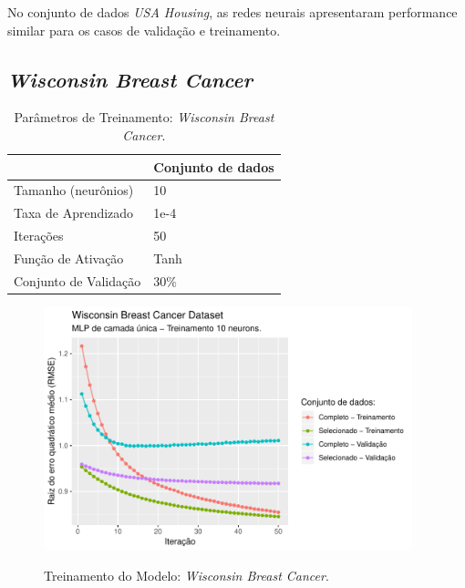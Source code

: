 No conjunto de dados \textit{USA Housing}, as redes neurais apresentaram performance similar para os casos de validação e treinamento.

\FloatBarrier
\subsection{\textit{Wisconsin Breast Cancer}}

\begin{table}[!htb]
    \caption{Parâmetros de Treinamento: \textit{Wisconsin Breast Cancer}.}
    \begin{center}
        \begin{tabular}{@{}ll@{}}
        \toprule
                            & Conjunto de dados \\ \midrule
        Tamanho (neurônios)     & 10                \\
        Taxa de Aprendizado   & 1e-4              \\
        Iterações             & 50                \\
        Função de Ativação    & Tanh              \\
        Conjunto de Validação & $30\%$            \\ \bottomrule
        \end{tabular}
    \end{center}
    \label{tbl:treinamento_cancer}
\end{table}

\begin{figure}[!htb]
    \centering
    \caption{Treinamento do Modelo: \textit{Wisconsin Breast Cancer}.}
    \includegraphics[height=200pt]{imgs/res/WisconsinBreastCancerDataset_model.pdf}
    \label{fig:modelo_WisconsinBreastCancerDataset_model}
\end{figure}

